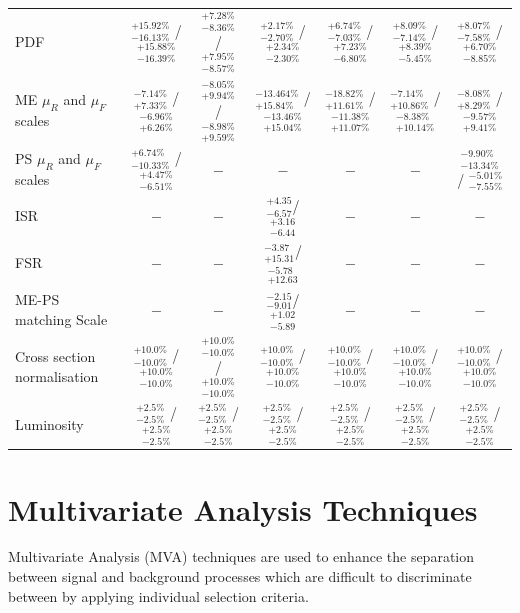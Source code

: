 \begin{table}
\begin{center}
{\begin{tabular}{lcccccc}
PDF             &  $_{-16.13\%}^{+15.92\%}$ /  $_{-16.39\%}^{+15.88\%}$   & $_{-8.36\%}^{+7.28\%}$ / $_{-8.57\%}^{+7.95\%}$  & $_{-2.70\%}^{+2.17\%}$ / $_{-2.30\%}^{+2.34\%}$  & $_{-7.03\%}^{+6.74\%}$ / $_{-6.80\%}^{+7.23\%}$  & $_{-7.14\%}^{+8.09\%}$ / $_{-5.45\%}^{+8.39\%}$ & $_{-7.58\%}^{+8.07\%}$ / $_{-8.85\%}^{+6.70\%}$\\
ME $\mu_{R}$ and $\mu_{F}$ scales             &  $_{+7.33\%}^{-7.14\%}$ /  $_{+6.26\%}^{-6.96\%}$   & $_{+9.94\%}^{-8.05\%}$ / $_{+9.59\%}^{-8.98\%}$  & $_{+15.84\%}^{-13.464\%}$ / $_{+15.04\%}^{-13.46\%}$  & $_{+11.61\%}^{-18.82\%}$ / $_{+11.07\%}^{-11.38\%}$  & $_{+10.86\%}^{-7.14\%}$ / $_{+10.14\%}^{-8.38\%}$ & $_{+8.29\%}^{-8.08\%}$ / $_{+9.41\%}^{-9.57\%}$\\
PS $\mu_{R}$ and $\mu_{F}$ scales             &  $_{-10.33\%}^{+6.74\%}$ /  $_{-6.51\%}^{+4.47\%}$  & $-$  & $-$  & $-$  & $-$ & $_{-13.34\%}^{-9.90\%}$ / $_{-7.55\%}^{-5.01\%}$  \\
ISR             &  $-$   & $-$  & $^{+4.35}_{-6.57}$/$_{-6.44}^{+3.16}$ & $-$  & $-$ & $-$  \\
FSR             &  $-$   & $-$  & $_{+15.31}^{-3.87}$/$^{-5.78}_{+12.63}$ & $-$  & $-$ & $-$  \\ 
ME-PS matching Scale             &  $-$   & $-$  & $^{-2.15}_{-9.01}$/$_{-5.89}^{+1.02}$ & $-$  & $-$ & $-$ \\
Cross section normalisation             &  $_{-10.0\%}^{+10.0\%}$ /  $_{-10.0\%}^{+10.0\%}$    & $_{-10.0\%}^{+10.0\%}$  / $_{-10.0\%}^{+10.0\%}$   & $_{-10.0\%}^{+10.0\%}$  / $_{-10.0\%}^{+10.0\%}$   & $_{-10.0\%}^{+10.0\%}$  / $_{-10.0\%}^{+10.0\%}$  & $_{-10.0\%}^{+10.0\%}$  / $_{-10.0\%}^{+10.0\%}$ & $_{-10.0\%}^{+10.0\%}$  / $_{-10.0\%}^{+10.0\%}$ \\    
Luminosity             &  $_{-2.5\%}^{+2.5\%}$ /  $_{-2.5\%}^{+2.5\%}$    & $_{-2.5\%}^{+2.5\%}$  / $_{-2.5\%}^{+2.5\%}$   & $_{-2.5\%}^{+2.5\%}$  / $_{-2.5\%}^{+2.5\%}$   & $_{-2.5\%}^{+2.5\%}$  / $_{-2.5\%}^{+2.5\%}$  & $_{-2.5\%}^{+2.5\%}$  / $_{-2.5\%}^{+2.5\%}$ & $_{-2.5\%}^{+2.5\%}$  / $_{-2.5\%}^{+2.5\%}$ \\    
\hline
\end{tabular}
}
\end{center}
\end{table}

\section{Multivariate Analysis Techniques}\label{sec:mvas}
Multivariate Analysis (MVA) techniques are used to enhance the separation between signal and background processes which are difficult to discriminate between by applying individual selection criteria.

